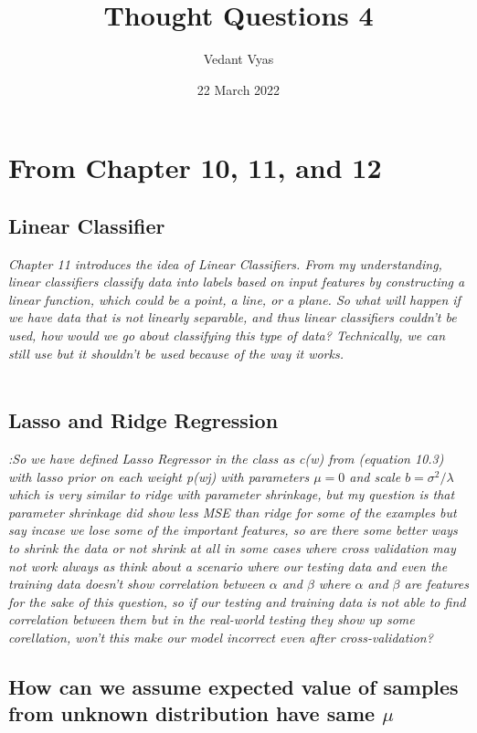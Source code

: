 \documentclass{article}
\title{Thought Questions 4}
\author{Vedant Vyas}
\date{22 March 2022}
\begin{document}
\maketitle

\section{From Chapter 10, 11, and 12}

\subsection{Linear Classifier} 
\textit{Chapter 11 introduces the idea of Linear Classifiers. From my understanding, linear classifiers classify data into labels based on input features by constructing a linear function, which could be a point, a line, or a plane. So what will happen if we have data that is not linearly separable, and thus linear classifiers couldn't be used, how would we go about classifying this type of data? Technically, we can still use but it shouldn't be used because of the way it works.  }\\\\


\subsection{Lasso and Ridge Regression} 

\textit{:So we have defined Lasso Regressor in the class as c(w) from (equation 10.3) with lasso prior on each weight p(wj) with parameters $\mu = 0$  and scale $b = \sigma^2/ {\lambda}$ which is very similar to ridge with parameter shrinkage, but my question is that parameter shrinkage did show less MSE than ridge for some of the examples but say incase we lose some of the important features, so are there some better ways to shrink the data or not shrink at all in some cases where cross validation may not work always as think about a scenario where our testing data and even the training data doesn't show correlation between $\alpha$ and $\beta$ where $\alpha$ and $\beta$ are features for the sake of this question, so if our testing and training data is not able to find correlation between them but in the real-world testing they show up some corellation, won't this make our model incorrect even after cross-validation?
}
\subsection{How can we assume expected value of samples from unknown distribution have same $\mu$ } 
\end{document}
